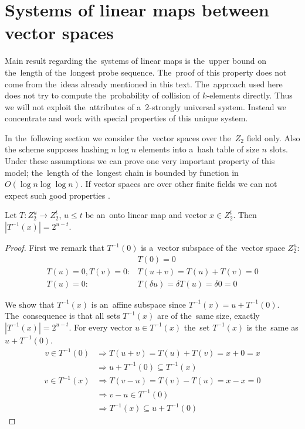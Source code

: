 \chapter{Systems of linear maps between vector spaces}

Main result regarding the~systems of linear maps is the~upper bound on the~length of the~longest probe sequence. The~proof of this property does not come from the~ideas already mentioned in this text. The~approach used here does not try to compute the~probability of collision of $k$-elements directly. Thus we will not exploit the~attributes of a~$2$-strongly universal system. Instead we concentrate and work with special properties of this unique system.

In the~following section we consider the~vector spaces over the~$Z_2$ field only. Also the scheme supposes hashing $n \log n$ elements into a~hash table of size $n$ slots. Under these assumptions we can prove one very important property of this model; the~length of the~longest chain is bounded by function in $O(\log n \log \log n)$. If vector spaces are over other finite fields we can not expect such good properties \cite{linear-hash-functions}.

\begin{lemma}
\label{lemma-linear-transformation-domain-distribution}
Let $T: Z_2^u \rightarrow Z_2^t$, $u \leq t$ be an~onto linear map and vector $x \in Z_2^t$. Then $|T^{-1}(x)| = 2 ^ {u-t}$.
\end{lemma}
\begin{proof}
First we remark that $T^{-1}(0)$ is a~vector subspace of the~vector space $Z_2^u$:
\begin{displaymath}
\begin{split}
& T(0) = 0 \\
T(u) = 0, T(v) = 0: & T(u + v) = T(u) + T(v) = 0 \\
T(u) = 0: & T(\delta u) = \delta T(u) = \delta 0 = 0
\end{split}
\end{displaymath}

We show that $T^{-1}(x)$ is an~affine subspace since $T^{-1}(x) = u + T^{-1}(0)$. The~consequence is that all sets $T^{-1}(x)$ are of the~same size, exactly $|T^{-1}(x)| = 2^{u-t}$. For every vector $u \in T^{-1}(x)$ the~set $T^{-1}(x)$ is the~same as $u + T^{-1}(0)$.
\begin{displaymath}
\begin{split}
v \in T^{-1}(0) 
	& \Rightarrow T(u+v) = T(u) + T(v) = x + 0 = x  \\
	& \Rightarrow u + T^{-1}(0) \subseteq T^{-1}(x)
\end{split}
\end{displaymath}
\begin{displaymath}
\begin{split}
v \in T^{-1}(x) 
	& \Rightarrow T(v-u) = T(v) - T(u) = x - x = 0 \\
	& \Rightarrow v - u \in T^{-1}(0) \\
	& \Rightarrow T^{-1}(x) \subseteq u + T^{-1}(0)
\end{split}
\end{displaymath}
\end{proof}

